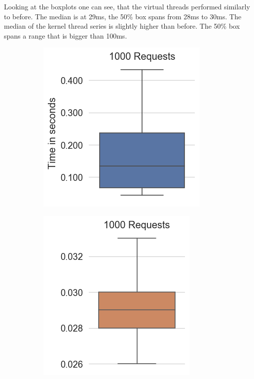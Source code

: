 Looking at the boxplots one can see, that the virtual threads performed similarly to before. The median is at 29ms, the 50\% box spans from 28ms to 30ms. The median of the kernel thread series is slightly higher than before. The 50\% box spans a range that is bigger than 100ms.

\begin{figure}[H]
  \centering
  \begin{subfigure}[b]{0.45\textwidth}
    \includegraphics[width=1.0\linewidth]{img/footprint/boxplots-t-1000.png}
  \end{subfigure}
  \begin{subfigure}[b]{0.45\textwidth}
    \includegraphics[width=1.0\linewidth]{img/footprint/boxplots-vt-1000.png}

\end{subfigure}
\end{figure}
